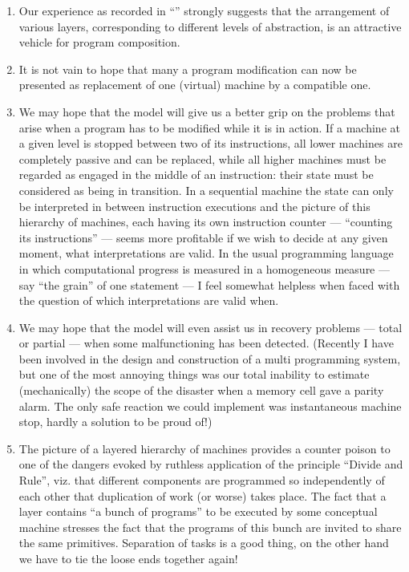 \begin{enumerate}[leftmargin=2\parindent, label=(\arabic*)]
	\item Our experience as recorded in ``'' strongly suggests that the arrangement of various layers, corresponding to different levels of abstraction, is an attractive vehicle for program composition.

	\item It is not vain to hope that many a program modification can now be presented as replacement of one (virtual) machine by a compatible one.

	\item We may hope that the model will give us a better grip on the problems that arise when a program has to be modified while it is in action. If a machine at a given level is stopped between two of its instructions, all lower  machines are completely passive and can be replaced, while all higher machines must be regarded as engaged in the middle of an instruction: their state must be considered as being in transition. In a sequential machine the state can only be interpreted in between instruction executions and the picture of this hierarchy of machines, each having its own instruction counter --- ``counting its instructions'' --- seems more profitable if we wish to decide at any given moment, what interpretations are valid. In the usual programming language in which computational progress is measured in a homogeneous measure --- say ``the grain'' of one statement --- I feel somewhat helpless when faced with the question of which interpretations are valid when.
	
	\item We may hope that the model will even assist us in recovery problems 	--- total or partial --- when some malfunctioning has been detected. (Recently I have been involved in the design and construction of a multi programming system, but one of the most annoying things was our total inability to estimate (mechanically) the scope of the disaster when a memory cell gave a parity alarm. The only safe reaction we could implement was instantaneous machine stop, hardly a solution to be proud of!)
	
	\item The picture of a layered hierarchy of machines provides a counter 	poison to one of the dangers evoked by ruthless application of the principle ``Divide and Rule'', viz. that different components are programmed so independently of each other that duplication of work (or worse) takes place. The fact that a layer contains ``a bunch of programs'' to be executed by some conceptual machine stresses the fact that the programs of this bunch are invited to share the same primitives. Separation of tasks is a good thing, on the other hand we have to tie the loose ends together again!
\end{enumerate}


